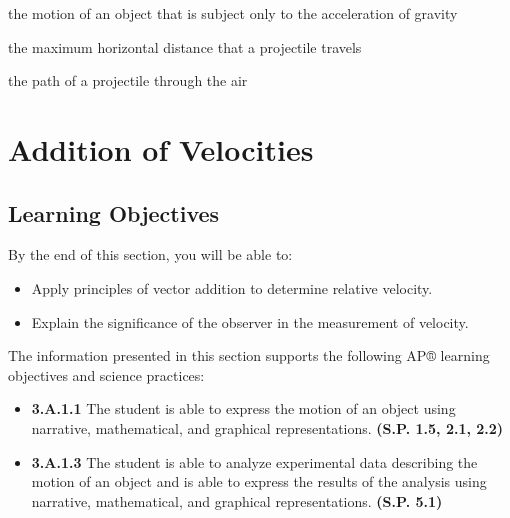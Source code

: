 \documentclass[
]{book}
\providecommand{\tightlist}{%
  \setlength{\itemsep}{0pt}\setlength{\parskip}{0pt}}
\newenvironment{learning-objectives}{}{}
\begin{document}
\begin{description}
\tightlist
\item[projectile motion]
the motion of an object that is subject only to the acceleration of
gravity
\end{description}

\begin{description}
\tightlist
\item[range]
the maximum horizontal distance that a projectile travels
\end{description}

\begin{description}
\tightlist
\item[trajectory]
the path of a projectile through the air
\end{description}

\hypertarget{addition-of-velocities}{%
\section{Addition of Velocities}\label{addition-of-velocities}}

\hypertarget{fs-id1524943}{}
\begin{learning-objectives}

\hypertarget{learning-objectives-12}{%
\subsection{Learning Objectives}\label{learning-objectives-12}}

By the end of this section, you will be able to:

\begin{itemize}
\tightlist
\item
  Apply principles of vector addition to determine relative velocity.
\item
  Explain the significance of the observer in the measurement of
  velocity.
\end{itemize}

The information presented in this section supports the following AP®
learning objectives and science practices:

\begin{itemize}
\tightlist
\item
  \textbf{3.A.1.1} The student is able to express the motion of an object
  using narrative, mathematical, and graphical representations.
  \textbf{(S.P. 1.5, 2.1, 2.2)}
\item
  \textbf{3.A.1.3} The student is able to analyze experimental data
  describing the motion of an object and is able to express the
  results of the analysis using narrative, mathematical, and graphical
  representations. \textbf{(S.P. 5.1)}
\end{itemize}

\end{learning-objectives}
\end{document}
